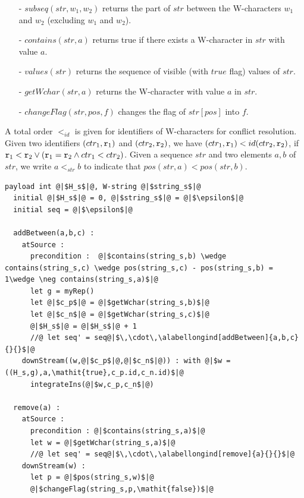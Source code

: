 {\begin{itemize}
\item[-] $subseq(str,w_1,w_2)$ returns the part of $str$ between the W-characters $w_1$ and $w_2$ (excluding $w_1$ and $w_2$).

\item[-] $contains(str,a)$ returns true if there exists a W-character in $str$ with value $a$.

\item[-] $values(str)$ returns the sequence of visible (with $\mathit{true}$ flag) values of $str$.

\item[-] $getWchar(str,a)$ returns the W-character with value $a$ in $str$.

\item[-] $changeFlag(str,pos,f)$ changes the flag of $str[pos]$ into $f$.
\end{itemize}


A total order $<_{id}$ is given for identifiers of W-characters for conflict resolution. Given two identifiers $(ctr_1,\mathtt{r}_1)$ and $(ctr_2,\mathtt{r}_2)$, we have $(ctr_1,\mathtt{r}_1) <{id} (ctr_2,\mathtt{r}_2)$, if $\mathtt{r}_1 < \mathtt{r}_2 \vee (\mathtt{r}_1 = \mathtt{r}_2 \wedge ctr_1 < ctr_2)$. Given a sequence $str$ and two elements $a,b$ of $str$, we write $a <_{str} b$ to indicate that $pos(str,a) < pos(str,b)$.

\begin{minipage}[t]{1.0\linewidth}
\begin{lstlisting}[frame=top,caption={Pseudo-code of WOOT algorithm},
captionpos=b,label={lst:woot algorithm}]
  payload int @|$H_s$|@, W-string @|$string_s$|@
  initial @|$H_s$|@ = 0, @|$string_s$|@ = @|$\epsilon$|@
  initial seq = @|$\epsilon$|@

  addBetween(a,b,c) :
    atSource :
      precondition :  @|$contains(string_s,b) \wedge contains(string_s,c) \wedge pos(string_s,c) - pos(string_s,b) = 1\wedge \neg contains(string_s,a)$|@
      let g = myRep()
      let @|$c_p$|@ = @|$getWchar(string_s,b)$|@
      let @|$c_n$|@ = @|$getWchar(string_s,c)$|@
      @|$H_s$|@ = @|$H_s$|@ + 1
      //@ let seq' = seq@|$\,\cdot\,\alabellongind[addBetween]{a,b,c}{}{}$|@
    downStream((w,@|$c_p$|@,@|$c_n$|@)) : with @|$w = ((H_s,g),a,\mathit{true},c_p.id,c_n.id)$|@
      integrateIns(@|$w,c_p,c_n$|@)

  remove(a) :
    atSource :
      precondition : @|$contains(string_s,a)$|@
      let w = @|$getWchar(string_s,a)$|@
      //@ let seq' = seq@|$\,\cdot\,\alabellongind[remove]{a}{}{}$|@
    downStream(w) :
      let p = @|$pos(string_s,w)$|@
      @|$changeFlag(string_s,p,\mathit{false})$|@


\end{lstlisting}
\end{minipage}}
